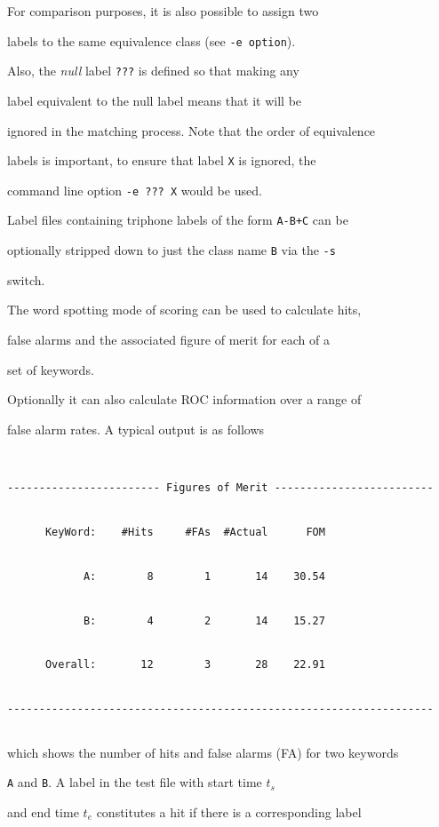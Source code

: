 For comparison purposes, it is also possible to assign two


labels to the same equivalence class (see {\tt -e option}).  


Also, the {\em null} label {\tt ???} is defined so that making any


label equivalent to the null label means that it will be


ignored in the matching process.  Note that the order of equivalence


labels is important, to ensure that label {\tt X} is ignored, the


command line option \verb+-e ??? X+ would be used.


Label files containing triphone labels of the form {\tt A-B+C} can be 


optionally stripped down to just the class name {\tt B} via the {\tt -s} 


switch.





The word spotting mode of scoring can be used to calculate hits,


false alarms and the associated figure of merit for each of a


set of keywords.


Optionally it can also calculate ROC information over a range of


false alarm rates.  A typical output is as follows


\begin{verbatim}


------------------------ Figures of Merit -------------------------


      KeyWord:    #Hits     #FAs  #Actual      FOM


            A:        8        1       14    30.54


            B:        4        2       14    15.27


      Overall:       12        3       28    22.91


-------------------------------------------------------------------


\end{verbatim}


which shows the number of hits and false alarms (FA) for two keywords


\texttt{A} and \texttt{B}.  A label in the test file with start time $t_s$


and end time $t_e$ constitutes a hit if there is a corresponding label


